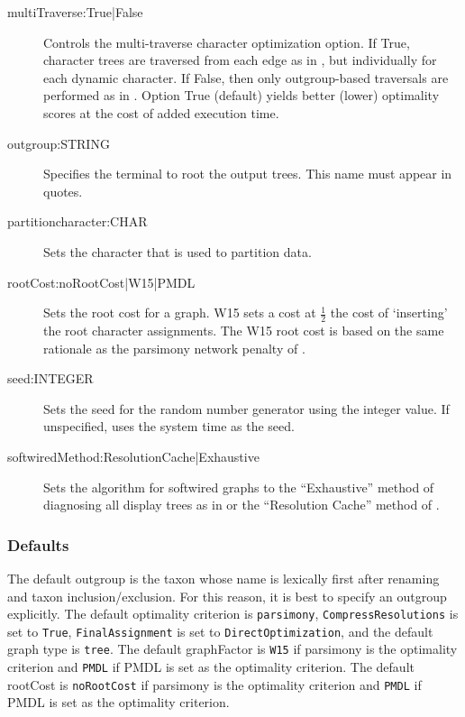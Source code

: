 \begin{description}
			
			\item[multiTraverse:True|False] Controls the multi-traverse character optimization option.  If True, 
			character trees are traversed from each edge as in \citep{VaronandWheeler2012, VaronandWheeler2013, POY4, POY5},
			but individually for each dynamic character. If False, then only outgroup-based traversals are performed
			as in \citep{Wheeler1996, POY2, POY3}.  Option True (default) yields better (lower) optimality scores
			at the cost of added execution time.
			
			\item[outgroup:STRING] Specifies the terminal to root the output trees. 
			This name must appear in quotes. 
			
			\item[partitioncharacter:CHAR] Sets the character that is used to partition data. %
			
			\item[rootCost:noRootCost|W15|PMDL] Sets the root cost for a graph. W15 sets a 
			cost at $\frac{1}{2}$ the cost of `inserting' the root character assignments. 
			The W15 root cost is based on the same rationale as the parsimony network penalty of
			 \cite{Wheeler2015}.
			 
			 \item[seed:INTEGER] Sets the seed for the random number generator using the integer
			 value. If unspecified, \phyg uses the system time as the seed.
			 
			 \item[softwiredMethod:ResolutionCache|Exhaustive] Sets the algorithm for softwired graphs 
			 to the ``Exhaustive'' method of diagnosing all display trees as in \cite{Wheeler2015} or
			 the ``Resolution Cache'' method of \cite{WheelerandWashburn2023}.  
			 
		\end{description}
					
	\subsubsection{Defaults} 
		The default outgroup is the taxon whose name is 
		lexically first after renaming and taxon inclusion/exclusion. For this reason, it is best to specify 
		an outgroup explicitly. The default optimality criterion is \texttt{parsimony}, \texttt{CompressResolutions} 
		is set to \texttt{True}, \texttt{FinalAssignment} is set to \texttt{DirectOptimization}, and the default 
		graph type is \texttt{tree}. The default graphFactor is \texttt{W15} if parsimony is the optimality 
		criterion and \texttt{PMDL} if PMDL is set as the optimality criterion. The default rootCost
		is \texttt{noRootCost} if parsimony is the optimality criterion and \texttt{PMDL} if PMDL is set 
		as the optimality criterion.
		
